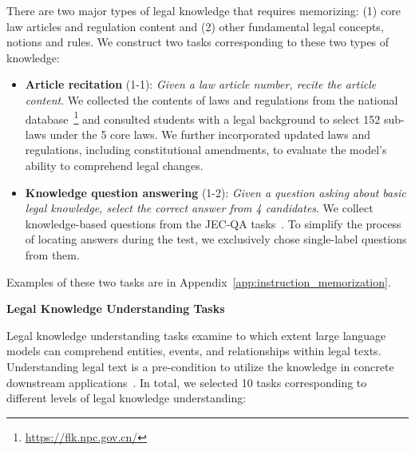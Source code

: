 There are two major types of legal knowledge that requires memorizing: (1) core law articles and regulation content and (2) other fundamental legal concepts, notions and rules. We construct two tasks corresponding to these two types of knowledge: 
\begin{itemize}
    \item \textbf{Article recitation} (1-1): \emph{Given a law article number, recite the article content}. We collected the contents of laws and regulations from the national database~\footnote{\url{https://flk.npc.gov.cn/}} and consulted students with a legal background to select 152 sub-laws under the 5 core laws.
    We further incorporated updated laws and regulations, including constitutional amendments, to evaluate the model's ability to comprehend legal changes.
    \item \textbf{Knowledge question answering} (1-2): \emph{Given a question asking about basic legal knowledge, select the correct answer from 4 candidates}. We collect knowledge-based questions from the JEC-QA tasks~\cite{zhong2020jec}. To simplify the process of locating answers during the test, we exclusively chose single-label questions from them.
\end{itemize}
Examples of these two tasks are in Appendix~\ref{app:instruction_memorization}.

\textbf{Legal Knowledge Understanding Tasks}

Legal knowledge understanding tasks examine to which extent large language models can comprehend entities, events, and relationships within legal texts. Understanding legal text is a pre-condition to utilize the knowledge in concrete downstream applications~\cite{cui2022survey}. In total, we selected 10 tasks corresponding to different levels of legal knowledge understanding:

